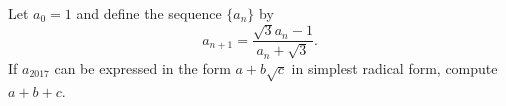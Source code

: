 Let $a_0 = 1$ and define the sequence $\{a_n\}$ by \[a_{n+1} = \frac{\sqrt{3}a_n - 1}{a_n + \sqrt{3}}.\] If $a_{2017}$ can be expressed in the form $a+b\sqrt{c}$ in simplest radical form, compute $a+b+c$.